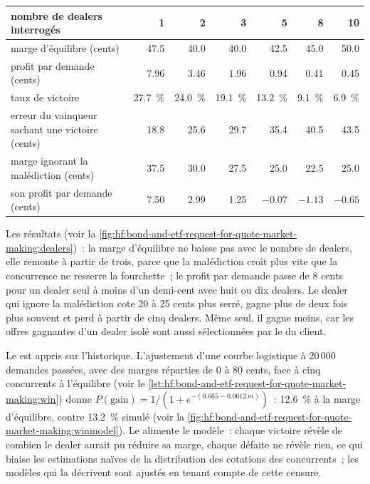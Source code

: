 \begin{center}
\small
\begin{tabular}{@{}lrrrrrr@{}}
\toprule
nombre de dealers interrogés & 1 & 2 & 3 & 5 & 8 & 10\\
\midrule
marge d'équilibre (cents) & 47.5 & 40.0 & 40.0 & 42.5 & 45.0 & 50.0\\
profit par demande (cents) & 7.96 & 3.46 & 1.96 & 0.94 & 0.41 & 0.45\\
taux de victoire & 27.7~\% & 24.0~\% & 19.1~\% & 13.2~\% & 9.1~\% & 6.9~\%\\
erreur du vainqueur sachant une victoire (cents) & 18.8 & 25.6 & 29.7 & 35.4 & 40.5 & 43.5\\
marge ignorant la malédiction (cents) & 37.5 & 30.0 & 27.5 & 25.0 & 22.5 & 25.0\\
son profit par demande (cents) & 7.50 & 2.99 & 1.25 & $-0.07$ & $-1.13$ & $-0.65$\\
\bottomrule
\end{tabular}
\end{center}

Les résultats (voir la \cref{fig:hf:bond-and-etf-request-for-quote-market-making:dealers})~: la marge d'équilibre ne baisse pas avec le nombre de dealers, elle remonte
à partir de trois, parce que la malédiction croît plus vite que la concurrence ne resserre la fourchette~; le profit par demande passe de 8 cents pour un dealer seul à moins d'un demi-cent
avec huit ou dix dealers. Le dealer qui ignore la malédiction cote 20 à 25 cents plus serré, gagne plus de deux fois plus souvent et perd à partir de cinq dealers.
Même seul, il gagne moins, car les offres gagnantes d'un dealer isolé sont aussi sélectionnées par le  du client.

Le  est appris sur l'historique. L'ajustement d'une courbe logistique à 20\,000 demandes passées, avec des marges réparties de 0 à 80 cents, face
à cinq concurrents à l'équilibre (voir le \cref{lst:hf:bond-and-etf-request-for-quote-market-making:win}) donne
$P(\text{gain})=1/(1+e^{-(0.665-0.0612\,m)})$~: 12.6~\% à la marge d'équilibre, contre 13.2~\% simulé
(voir la \cref{fig:hf:bond-and-etf-request-for-quote-market-making:winmodel}). Le  alimente le modèle~: chaque victoire révèle de combien le dealer aurait pu
réduire sa marge, chaque défaite ne révèle rien, ce qui biaise les estimations naïves de la distribution des cotations des concurrents~; les modèles qui la décrivent sont ajustés en tenant compte de
cette censure.


